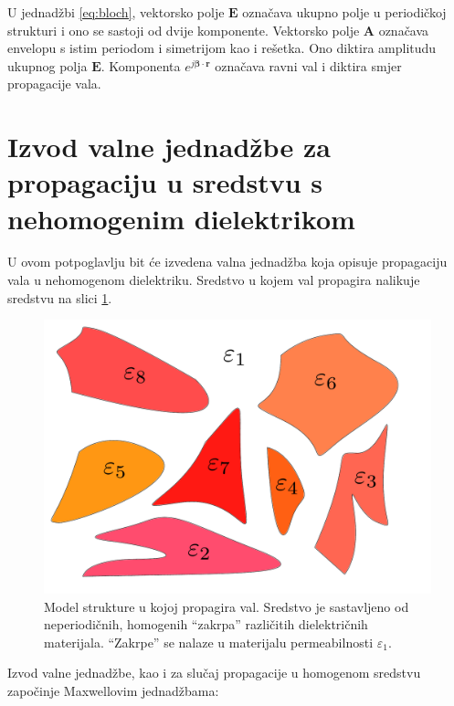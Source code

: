 \documentclass[utf8, seminar]{fer}
\begin{document}
U jednadžbi \ref{eq:bloch}, vektorsko polje $\mathbf{E}$ označava ukupno polje
u periodičkoj strukturi i ono se sastoji od dvije komponente. Vektorsko polje
$\mathbf{A}$ označava envelopu s istim periodom i simetrijom kao i rešetka.
Ono diktira amplitudu ukupnog polja $\mathbf{E}$.
Komponenta ${e^{j {\bm{\beta}} \cdot \mathbf{r}}}$ označava ravni val i diktira
smjer propagacije vala.




\section{Izvod valne jednadžbe za propagaciju u sredstvu s nehomogenim dielektrikom}

U ovom potpoglavlju bit će izvedena valna jednadžba koja opisuje propagaciju
vala u nehomogenom dielektriku. Sredstvo u kojem val propagira nalikuje sredstvu
na slici \ref{fig:structure}.

\begin{figure}[ht]
	\centering
	\includegraphics[width = 1.0\linewidth]{./images/structure-model.pdf}
	\caption{Model strukture u kojoj propagira val. Sredstvo je sastavljeno od
	neperiodičnih, homogenih ``zakrpa'' različitih dielektričnih materijala.
	``Zakrpe'' se nalaze u materijalu permeabilnosti $\varepsilon_1$.}
	\label{fig:structure}
\end{figure}

\FloatBarrier

Izvod valne jednadžbe, kao i za slučaj propagacije u homogenom sredstvu započinje
Maxwellovim jednadžbama:
\end{document}

